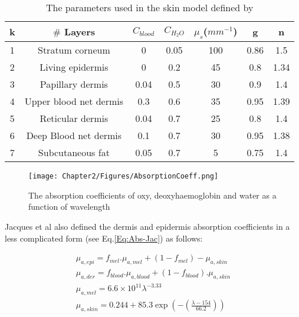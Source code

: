 	\begin{table}
	\caption{The parameters used in the skin model defined by \cite{meglinski2002quantitative}}
	\begin{center}
	\footnotesize
	\begin{tabular}{ c c c c c c c}
	\hline 
	k &  $\#$ Layers & $C_{blood}$ & $C_{H_{2}O}$ & $\mu_{s}$($mm^{-1}$) & g & n \\
	\hline 
	1 & Stratum corneum & 0 & 0.05 & 100 & 0.86 & 1.5 \\
	2 & Living epidermis & 0 & 0.2 & 45 & 0.8 & 1.34 \\
	3 & Papillary dermis & 0.04 & 0.5 & 30 & 0.9 & 1.4 \\ 
	4 & Upper blood net dermis & 0.3 & 0.6 & 35 & 0.95 & 1.39 \\ 
	5 & Reticular dermis & 0.04 & 0.7 & 25 & 0.8 & 1.4 \\
	6 & Deep Blood net dermis & 0.1 & 0.7 & 30 & 0.95 & 1.38 \\
	7 & Subcutaneous fat & 0.05 & 0.7 & 5 & 0.75 & 1.4 \\
	\hline 	  
	\end{tabular}
    \end{center}
	\label{T:MeglinskiTable}	
	\end{table}
	
	\begin{figure}
	\centering 
	\texttt{[image: Chapter2/Figures/AbsorptionCoeff.png]}	
	\caption{The absorption coefficients of oxy, deoxyhaemoglobin and water as a function of
wavelength \cite{jacques1996origins}}
	\label{fig:waterabsorptioninSkin}
	\end{figure}
	
	
	Jacques et al \cite{jacques1996origins} also defined the dermis and epidermis absorption coefficients in a less complicated form (see Eq.\ref{Eq:Abs-Jac}) as follows: 
	
	\begin{subequations}	
	\begin{align}	
	\mu_{a,epi} =f_{mel}.\mu_{a,mel}+ (1-f_{mel})-\mu_{a,skin}\\
	\mu_{a,der} = f_{blood}.\mu_{a,blood}+(1-f_{blood}).\mu_{a,skin}\\
	\mu_{a,mel} = 6.6 \times 10^{11}\lambda ^{-3.33}\\
	\mu_{a,skin} = 0.244 + 85.3 \exp(-(\frac{\lambda -154}{66.2})) 
	\end{align}
	\label{Eq:Abs-Jac}	
	\end{subequations}
	
